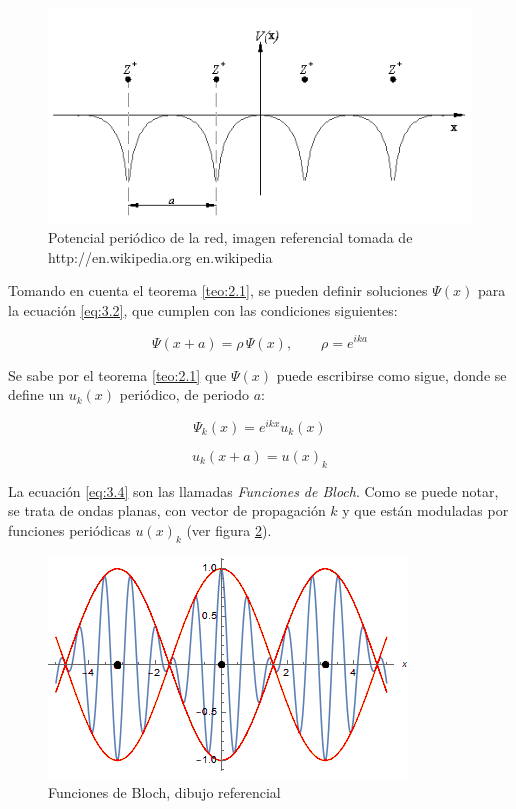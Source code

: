 \begin{figure}[H]
    \centering
    \includegraphics{imagenes/potencial-red.png}
    \caption{Potencial periódico de la red, imagen referencial tomada de http://en.wikipedia.org en.wikipedia}
    \label{fig:3.1}
\end{figure}

Tomando en cuenta el teorema \ref{teo:2.1}, se pueden definir soluciones $\Psi(x)$ para la ecuación \ref{eq:3.2}, que cumplen con las condiciones siguientes:

\begin{equation}\label{eq:3.3}
    \Psi(x+a)=\rho\,\Psi(x),\qquad{} \rho=e^{ika}
\end{equation}

Se sabe por el teorema \ref{teo:2.1} que $\Psi(x)$ puede escribirse como sigue, donde se define un $u_k(x)$ periódico, de periodo $a$:  

\begin{equation}\label{eq:3.4}
    \Psi_k(x)= e^{ikx}u_k(x)
\end{equation}

\begin{equation}\label{eq:3.5}
    u_{k} (x+a) =u(x)_{k}
\end{equation}

La ecuación \ref{eq:3.4} son las llamadas \textit{Funciones de Bloch}. Como se puede notar, se trata de ondas planas, con vector de propagación $k$ y que están moduladas por funciones periódicas $u(x)_k$ (ver figura \ref{fig:3.2}).

\begin{figure}[H]
    \centering
    \includegraphics[scale=.7]{imagenes/Bloch_function.png}
    \caption{Funciones de Bloch, dibujo referencial}
    \label{fig:3.2}
\end{figure}


